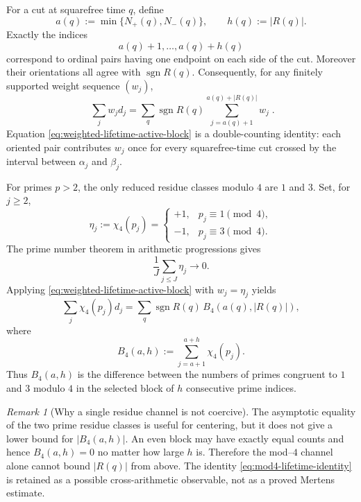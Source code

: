 \documentclass[11pt]{amsart}
\numberwithin{equation}{section}
\theoremstyle{plain}
\theoremstyle{definition}
\theoremstyle{remark}
\newtheorem{remark}[theorem]{Remark}
\begin{document}
For a cut at squarefree time $q$, define
\begin{equation}
\label{eq:active-block-start-height}
a(q):=\min\{N_+(q),N_-(q)\},
\qquad
h(q):=|R(q)|.
\end{equation}
Exactly the indices
\begin{equation}
\label{eq:active-index-block}
a(q)+1,\ldots,a(q)+h(q)
\end{equation}
correspond to ordinal pairs having one endpoint on each side of the cut.
Moreover their orientations all agree with $\operatorname{sgn}R(q)$.
Consequently, for any finitely supported weight sequence $(w_j)$,
\begin{equation}
\label{eq:weighted-lifetime-active-block}
\boxed{\;
\sum_j w_jd_j
=
\sum_q\operatorname{sgn}R(q)
\sum_{j=a(q)+1}^{a(q)+|R(q)|}w_j
\;}.
\end{equation}
Equation \eqref{eq:weighted-lifetime-active-block} is a double-counting
identity: each oriented pair contributes $w_j$ once for every squarefree-time
cut crossed by the interval between $\alpha_j$ and $\beta_j$.

For primes $p>2$, the only reduced residue classes modulo $4$ are $1$ and $3$.
Set, for $j\ge2$,
\begin{equation}
\label{eq:eta4-definition}
\eta_j:=\chi_4(p_j)=
\begin{cases}
+1,&p_j\equiv1\pmod4,\\
-1,&p_j\equiv3\pmod4.
\end{cases}
\end{equation}
The prime number theorem in arithmetic progressions gives
\begin{equation}
\label{eq:eta4-zero-mean}
\frac1J\sum_{j\le J}\eta_j\longrightarrow0.
\end{equation}
Applying \eqref{eq:weighted-lifetime-active-block} with $w_j=\eta_j$ yields
\begin{equation}
\label{eq:mod4-lifetime-identity}
\sum_j\chi_4(p_j)d_j
=
\sum_q\operatorname{sgn}R(q)\,
B_4(a(q),|R(q)|),
\end{equation}
where
\begin{equation}
\label{eq:B4-block-discrepancy}
B_4(a,h):=\sum_{j=a+1}^{a+h}\chi_4(p_j).
\end{equation}
Thus $B_4(a,h)$ is the difference between the numbers of primes congruent to
$1$ and $3$ modulo $4$ in the selected block of $h$ consecutive prime indices.

\begin{remark}[Why a single residue channel is not coercive]
\label{rem:mod4-not-coercive}
The asymptotic equality of the two prime residue classes is useful for
centering, but it does not give a lower bound for $|B_4(a,h)|$.  An even block
may have exactly equal counts and hence $B_4(a,h)=0$ no matter how large $h$
is.  Therefore the mod--$4$ channel alone cannot bound $|R(q)|$ from above.
The identity \eqref{eq:mod4-lifetime-identity} is retained as a possible
cross-arithmetic observable, not as a proved Mertens estimate.
\end{remark}
\end{document}
